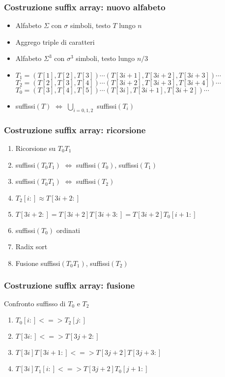 \begin{frame}
	\frametitle{Costruzione suffix array: nuovo alfabeto}
	\begin{itemize}
		\item
		      Alfabeto $\Sigma$ con $\sigma$ simboli, testo $T$ lungo $n$
		\item
		      Aggrego triple di caratteri
		\item
		      Alfabeto $\Sigma^{3}$ con $\sigma^{3}$ simboli, testo lungo $n/3$
		\item
		      $T_{1}=(T[1],T[2],T[3])\cdots (T[3i+1],T[3i+2],T[3i+3])\cdots$\\
		      $T_{2}=(T[2],T[3],T[4])\cdots (T[3i+2],T[3i+3],T[3i+4])\cdots$\\
		      $T_{0}=(T[3],T[4],T[5])\cdots (T[3i],T[3i+1],T[3i+2])\cdots$
		\item
		      suffissi$(T)$ $\Leftrightarrow$ $\bigcup_{i=0,1,2}$ suffissi$(T_{i})$
	\end{itemize}
\end{frame}

\begin{frame}
	\frametitle{Costruzione suffix array: ricorsione}
	\begin{enumerate}
		\item
		      Ricorsione su $T_{0}T_{1}$
		\item
		      suffissi$(T_{0}T_{1})$ $\Leftrightarrow$ suffissi$(T_{0})$, suffissi$(T_{1})$
		\item
		      suffissi$(T_{0}T_{1})$  $\Leftrightarrow$ suffissi$(T_{2})$
		\item
		      $T_{2}[i:] \approx T[3i+2:]$
		\item
		      $T[3i+2:] = T[3i+2]T[3i+3:] =T[3i+2]T_{0}[i+1:]$
		\item
		      suffissi$(T_{0})$ ordinati
		\item
		      Radix sort
		\item
		      Fusione suffissi$(T_{0}T_{1})$,  suffissi$(T_{2})$
	\end{enumerate}
\end{frame}

\begin{frame}
	\frametitle{Costruzione suffix array: fusione}
	Confronto suffisso di $T_{0}$ e $T_{2}$
	\begin{enumerate}
		\item
		      $T_{0}[i:] <=> T_{2}[j:]$
		\item
		      $T[3i:] <=> T[3j+2:]$
		\item
		      $T[3i]T[3i+1:] <=> T[3j+2]T[3j+3:]$
		\item
		      $T[3i]T_{1}[i:] <=> T[3j+2]T_{0}[j+1:]$
	\end{enumerate}
\end{frame}



